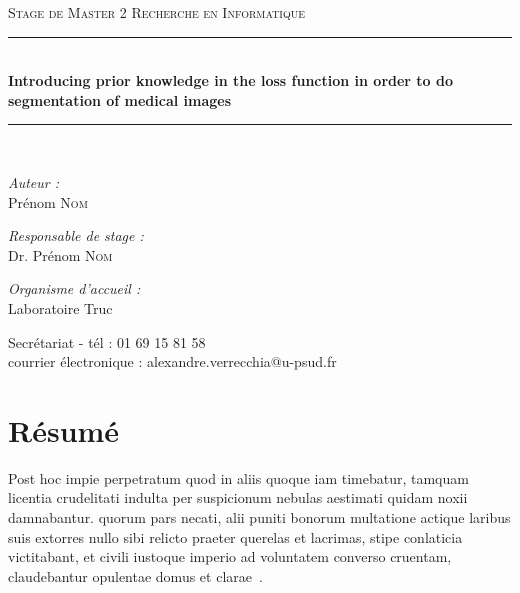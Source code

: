 \documentclass[oneside]{memoir}
\newcommand{\HRule}{\rule{\linewidth}{0.5mm}}
\begin{document}
\begin{titlingpage}
\begin{center}
\vspace{2cm} 
\textsc{\Large Stage de Master 2 Recherche en Informatique}\\[0.5cm]
 
 
\HRule \\[0.4cm]
{ \huge \bfseries Introducing prior knowledge in the loss function in order to do segmentation of medical images}\\[0.4cm]
 
\HRule \\[1.5cm]
 
\begin{minipage}{0.4\textwidth}
\begin{flushleft} \large
\emph{Auteur :}\\
Prénom \textsc{Nom}
\end{flushleft}
\end{minipage}
\begin{minipage}{0.4\textwidth}
\begin{flushright} \large
\emph{Responsable de stage :} \\
Dr. Prénom \textsc{Nom}
\end{flushright}
\end{minipage}
\vfill
\emph{Organisme d'accueil : }\\
Laboratoire Truc

 
\vfill


 
{Secrétariat - tél : 01 69 15 81 58\\
courrier électronique : alexandre.verrecchia@u-psud.fr\\
} 
\end{center}
 
\end{titlingpage}

\newcommand{\Loss}{\mathcal{L}}


\tableofcontents

\newpage
\thispagestyle{empty}%
\newpage

\chapter*{Résumé}

Post hoc impie perpetratum quod in aliis quoque iam timebatur, tamquam
licentia crudelitati indulta per suspicionum nebulas aestimati quidam
noxii damnabantur. quorum pars necati, alii puniti bonorum multatione
actique laribus suis extorres nullo sibi relicto praeter querelas et
lacrimas, stipe conlaticia victitabant, et civili iustoque imperio ad
voluntatem converso cruentam, claudebantur opulentae domus et
clarae~\cite{ammianius42}.
\end{document}
